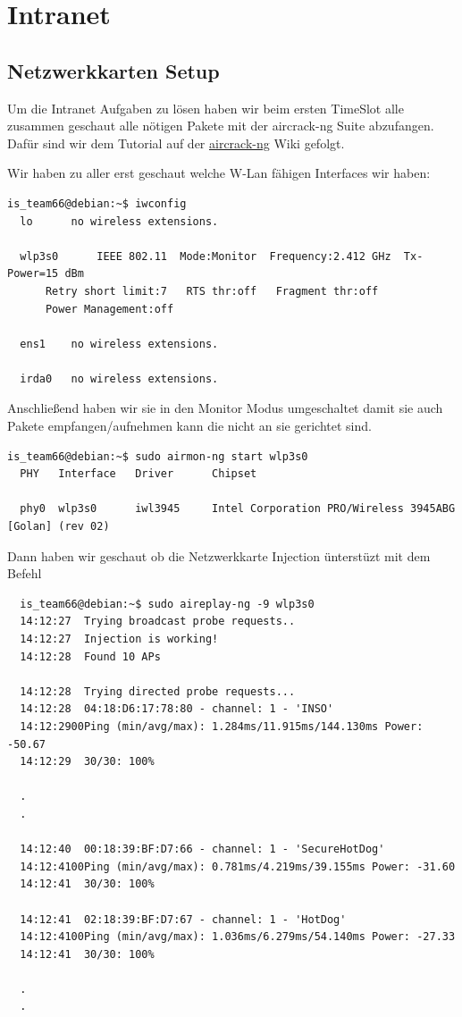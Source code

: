 \documentclass[12pt,a4paper,titlepage,oneside]{scrartcl}
\begin{document}
\pagebreak

\section{Intranet}

\subsection{Netzwerkkarten Setup}
Um die Intranet Aufgaben zu lösen haben wir beim ersten TimeSlot alle zusammen geschaut alle nötigen Pakete mit der aircrack-ng Suite abzufangen. Dafür sind wir dem Tutorial auf der \href{https://www.aircrack-ng.org/doku.php?id=cracking_wpa}{aircrack-ng} Wiki gefolgt.

Wir haben zu aller erst geschaut welche W-Lan fähigen Interfaces wir haben:

\begin{lstlisting}
is_team66@debian:~$ iwconfig
  lo	  no wireless extensions.
  
  wlp3s0	  IEEE 802.11  Mode:Monitor  Frequency:2.412 GHz  Tx-Power=15 dBm
      Retry short limit:7	RTS thr:off   Fragment thr:off
      Power Management:off
  
  ens1	  no wireless extensions.
  
  irda0	  no wireless extensions.
\end{lstlisting}

Anschließend haben wir sie in den Monitor Modus umgeschaltet damit sie auch Pakete empfangen/aufnehmen kann die nicht an sie gerichtet sind.

\begin{lstlisting}
is_team66@debian:~$ sudo airmon-ng start wlp3s0
  PHY	Interface	Driver		Chipset
  
  phy0	wlp3s0		iwl3945 	Intel Corporation PRO/Wireless 3945ABG [Golan] (rev 02)
\end{lstlisting}

Dann haben wir geschaut ob die Netzwerkkarte Injection ünterstüzt mit dem Befehl

\begin{lstlisting}
  is_team66@debian:~$ sudo aireplay-ng -9 wlp3s0
  14:12:27  Trying broadcast probe requests..
  14:12:27  Injection is working!
  14:12:28  Found 10 APs
  
  14:12:28  Trying directed probe requests...
  14:12:28  04:18:D6:17:78:80 - channel: 1 - 'INSO'
  14:12:2900Ping (min/avg/max): 1.284ms/11.915ms/144.130ms Power: -50.67
  14:12:29  30/30: 100%
  
  .
  .
  
  14:12:40  00:18:39:BF:D7:66 - channel: 1 - 'SecureHotDog'
  14:12:4100Ping (min/avg/max): 0.781ms/4.219ms/39.155ms Power: -31.60
  14:12:41  30/30: 100%
  
  14:12:41  02:18:39:BF:D7:67 - channel: 1 - 'HotDog'
  14:12:4100Ping (min/avg/max): 1.036ms/6.279ms/54.140ms Power: -27.33
  14:12:41  30/30: 100%
  
  .
  .
\end{lstlisting}
\end{document}

